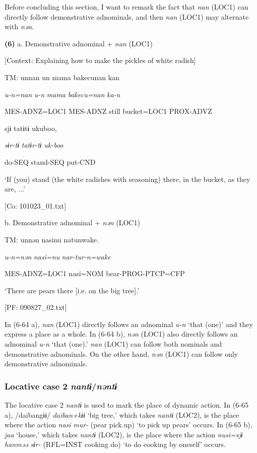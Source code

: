 Before concluding this section, I want to remark the fact that \textit{nan} (LOC1) can directly follow demonstrative adnominals, and then \textit{nan} (LOC1) may alternate with \textit{nən}.

\textbf{(6)}  a.  Demonstrative adnominal + \textit{nan} (LOC1)

    [Context: Explaining how to make the pickles of white radish]

    TM:  unnan  un  mama  {\textbar}bakecu{\textbar}nan  kan

      \textit{u-n=nan}  \textit{u-n}  \textit{mama}  \textit{bakecu=nan}  \textit{ka-n}

      MES-ADNZ=LOC1  MES-ADNZ  still  bucket=LOC1  PROX-ADVZ

      sjɨ  tatɨtɨ  ukuboo,

      \textit{sɨr-tɨ}  \textit{tatɨr-tɨ}  \textit{uk-boo}

      do-SEQ  stand-SEQ  put-CND

      ‘If (you) stand (the white radishes with seasoning) there, in the bucket, as they are, ...’

      [Co: 101023\_01.txt]

  b.  Demonstrative adnominal + \textit{nən} (LOC1)

    TM:  unnən  nasinu  natunwake.

      \textit{u-n=nən}  \textit{nasi=nu}  \textit{nar-tur-n=wake}

      MES-ADNZ=LOC1  nasi=NOM  bear-PROG-PTCP=CFP

      ‘There are pears there [i.e. on the big tree].’

      [PF: 090827\_02.txt]

In (6-64 a), \textit{nan} (LOC1) directly follows an adnominal \textit{u-n} ‘that (one)’ and they express a place as a whole. In (6-64 b), \textit{nən} (LOC1) also directly follows an adnominal \textit{u-n} ‘that (one).’ \textit{nan} (LOC1) can follow both nominals and demonstrative adnominals. On the other hand, \textit{nən} (LOC1) can follow only demonstrative adnominals.

\subsubsection{Locative case 2 \textit{nantɨ}/\textit{nəntɨ}}

The locative case 2 \textit{nantɨ} is used to mark the place of dynamic action. In (6-65 a), /daibangɨɨ/ \textit{daiban+kɨɨ} ‘big tree,’ which takes \textit{nantɨ} (LOC2), is the place where the action \textit{nasi} \textit{mur-} (pear pick.up) ‘to pick up pears’ occurs. In (6-65 b), \textit{jaa} ‘house,’ which takes \textit{nantɨ} (LOC2), is the place where the action \textit{nusi=sjɨ} \textit{hanməə} \textit{sɨr-} (RFL=INST cooking do) ‘to do cooking by oneself’ occurs.

